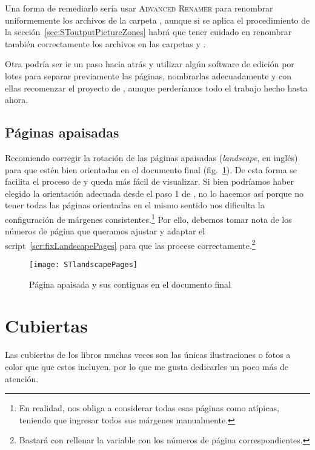 \documentclass[%
	a5paper,
	10pt,
	twoside,
	openright,
	final,
]{memoir}
\begin{document}
{	Una forma de remediarlo sería usar \textsc{Advanced Renamer} para renombrar uniformemente los archivos de la carpeta , aunque si se aplica el procedimiento de la sección~\ref{sec:SToutputPictureZones} habrá que tener cuidado en renombrar también correctamente los archivos en las carpetas  y .

	Otra podría ser ir un paso hacia atrás y utilizar algún software de edición por lotes para separar previamente las páginas, nombrarlas adecuadamente y con ellas recomenzar el proyecto de \scantailor, aunque perderíamos todo el trabajo hecho hasta ahora.

	\subsection{Páginas apaisadas\label{sec:landscapePages}} Recomiendo corregir la rotación de las páginas apaisadas (\emph{landscape}, en inglés) para que estén bien orientadas en el documento final (fig.~\ref{fig:STlandscapePages}). De esta forma se facilita el proceso de \ocr y queda más fácil de visualizar. Si bien podríamos haber elegido la orientación adecuada desde el paso 1 de \scantailor, no lo hacemos así porque no tener todas las páginas orientadas en el mismo sentido nos dificulta la configuración de márgenes consistentes.\footnote{En realidad, nos obliga a considerar todas esas páginas como atípicas, teniendo que ingresar todos sus márgenes manualmente.} Por ello, debemos tomar nota de los números de página que queramos ajustar y adaptar el script~\ref{scr:fixLandscapePages} para que las procese correctamente.\footnote{Bastará con rellenar la variable  con los números de página correspondientes.}

	\begin{figure}
		\texttt{[image: STlandscapePages]}
		\caption{Página apaisada y sus contiguas en el documento final\label{fig:STlandscapePages}}
	\end{figure}


	\section{Cubiertas\label{sec:covers}} Las cubiertas de los libros muchas veces son las únicas ilustraciones o fotos a color que que estos incluyen, por lo que me gusta dedicarles un poco más de atención.

}
\end{document}
